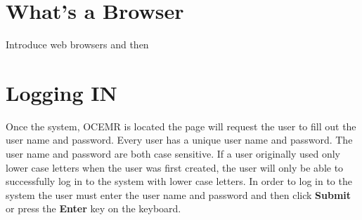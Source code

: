 \section{What's a Browser}
Introduce web browsers and then 
\section{Logging IN}
Once the system, OCEMR is located the
page will request the user to fill out the user name and password.
Every user has a unique user name and password. The user name and
password are both case sensitive. If a user originally used only lower
case letters when the user was first created, the user will only be
able to successfully log in to the system with lower case letters. In
order to log in to the system the user must enter the user name and
password and then click \textbf{Submit }or press the \textbf{Enter} key
on the keyboard.
